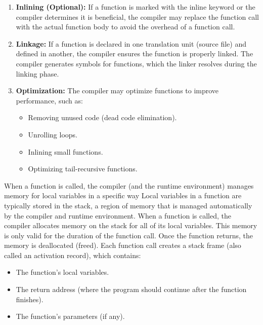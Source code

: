 \documentclass{report}
\begin{document}
\begin{enumerate}
\begin{itemize}
             \end{itemize}
         \item \textbf{Inlining (Optional):} If a function is marked with the inline keyword or the compiler determines it is beneficial, the compiler may replace the function call with the actual function body to avoid the overhead of a function call.
         \item \textbf{Linkage:}
             If a function is declared in one translation unit (source file) and defined in another, the compiler ensures the function is properly linked.
             \bigbreak \noindent 
            The compiler generates symbols for functions, which the linker resolves during the linking phase.
         \item \textbf{Optimization:}
             The compiler may optimize functions to improve performance, such as:
             \begin{itemize}
                 \item Removing unused code (dead code elimination).
                 \item Unrolling loops.
                 \item Inlining small functions.
                 \item Optimizing tail-recursive functions.
             \end{itemize}
     \end{enumerate}
     \bigbreak \noindent 
     When a function is called, the compiler (and the runtime environment) manages memory for local variables in a specific way
     \bigbreak \noindent 
     Local variables in a function are typically stored in the stack, a region of memory that is managed automatically by the compiler and runtime environment.
     \bigbreak \noindent 
     When a function is called, the compiler allocates memory on the stack for all of its local variables.
     \bigbreak \noindent 
     This memory is only valid for the duration of the function call. Once the function returns, the memory is deallocated (freed).
     \bigbreak \noindent 
     Each function call creates a stack frame (also called an activation record), which contains:
     \begin{itemize}
         \item The function's local variables.
         \item The return address (where the program should continue after the function finishes).
         \item The function's parameters (if any).
     \end{itemize}
\end{document}
